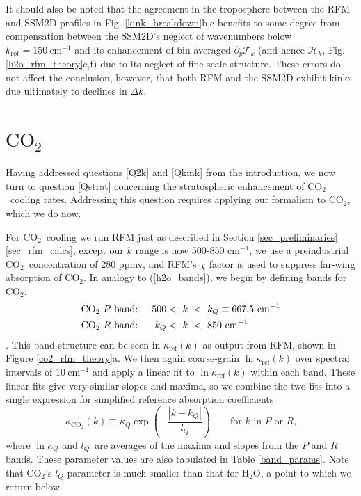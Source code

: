 \documentclass{ametsoc}
\newcommand{\beqn}{\begin{equation}}
\newcommand{\eeqn}{\end{equation}}
\newcommand{\beqa}{\begin{eqnarray}}
\newcommand{\eeqa}{\end{eqnarray}}
\newcommand{\eqnref}[1]{(\ref{#1})}
\newcommand{\cminverse}{\ensuremath{\mathrm{cm^{-1}}}}
\newcommand{\ppp}{\ensuremath{\partial_p}}
\newcommand{\cotwo}{\ensuremath{\mathrm{CO_2}}}
\newcommand{\htwo}{\ensuremath{\mathrm{H_2O}}}
\newcommand{\trans}{\ensuremath{\mathcal{T}}}
\newcommand{\ch}{\ensuremath{\mathcal{H}}}
\newcommand{\chk}{\ensuremath{\ch_k}}
\newcommand{\kapparef}{\ensuremath{\kappa_{\mathrm{ref}}}}
\newcommand{\kappaQ}{\ensuremath{\kappa_Q}}
\newcommand{\krot}{\ensuremath{k_\mathrm{rot}}}
\newcommand{\kQ}{\ensuremath{k_Q}}
\newcommand{\lrot}{\ensuremath{l_\mathrm{rot}}}
\newcommand{\lQ}{\ensuremath{l_{Q}}}
\begin{document}
It should also be noted that the agreement in the troposphere between the RFM and SSM2D profiles in Fig. \ref{kink_breakdown}b,c benefits to some degree from compensation between the SSM2D's neglect of wavenumbers below $\krot = 150\ \cminverse$ and its enhancement of bin-averaged $\ppp \trans_k$ (and hence \chk, Fig. \ref{h2o_rfm_theory}c,f) due to its neglect of fine-scale structure. These errors do not affect the conclusion, however, that both RFM and the SSM2D exhibit kinks due ultimately to declines in $\Delta k$.
 
\section{\cotwo\ } \label{sec_co2}
Having addressed questions \ref{Q2k} and \ref{Qkink} from the introduction,  we now turn to question \ref{Qstrat} concerning the stratospheric enhancement of \cotwo\ cooling rates. Addressing this question requires applying our formalism to \cotwo, which we do now.

For \cotwo\ cooling we run RFM just as described in Section \ref{sec_preliminaries}\ref{sec_rfm_calcs}, except our $k$ range is now 500-850 \cminverse, we use a preindustrial \cotwo\ concentration of 280 ppmv, and RFM's $\chi$ factor \citep[from ][]{cousin1985} is used to suppress far-wing absorption of \cotwo. In analogy to  \eqnref{h2o_bands}, we begin by defining bands for \cotwo:
\beqa
		\begin{split}
	    		\text{\cotwo\ $P$ band: } && 500 &<\   k\ <\  \kQ\equiv 667.5\ \cminverse \\
    			\text{\cotwo\ $R$ band: } & & \kQ &<\   k\ < \  850\ \cminverse  \ 
		\end{split}
		\label{co2_bands}
\eeqa
 \citep[here \kQ\ denotes the spectral location of the main \cotwo\ $Q$ branch, which lies between its associated $P$ and $R$ branches but has a much smaller spectral width, e.g.][]{coakley2014}. This band structure can be seen in $\kapparef(k)$ as output from RFM, shown in Figure \ref{co2_rfm_theory}a. We then again coarse-grain $\ln \kapparef(k)$ over spectral intervals of $10 \ \cminverse$ and apply a linear fit to $\ln \kapparef(k)$ within each band. These linear fits give very similar slopes and maxima, so we combine the two fits into a single expression for simplified reference absorption coefficients
  \beqn
 	\kappa_{\cotwo}(k)  \equiv   \kappaQ \exp\left(-\frac{|k-\kQ|}{\lQ}\right) \quad \quad \text{for $k$ in $P$ or $R$,}   			
	\label{kappa_co2}  
\eeqn
 where $\ln \kappaQ$ and  \lQ\ are averages of the maxima and slopes from the $P$ and $R$ bands. These parameter values are also tabulated in Table \ref{band_params}. Note that \cotwo's $\lQ$ parameter is much smaller than that for \htwo, a point to which we return below.
\end{document}
